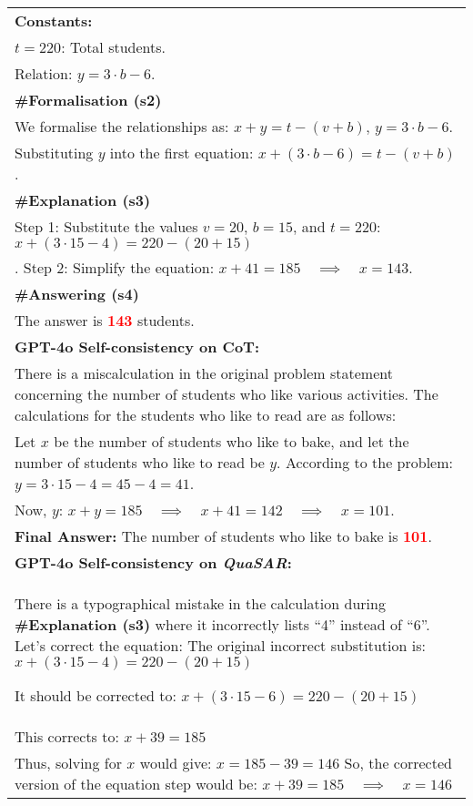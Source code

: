 \documentclass[11pt]{article}
\newcommand{\QuaSAR}{\emph{QuaSAR}\xspace}
\begin{document}
\begin{table*}[h!]
\begin{tabular}{p{16cm}}
\textbf{Constants:}\\
\hspace*{0.5cm} \( t = 220 \): Total students.\\
\hspace*{0.5cm} Relation: \( y = 3 \cdot b - 6. \)\\
\textbf{\#Formalisation (s2)}\\
We formalise the relationships as:
$x + y = t - (v + b)$, $y = 3 \cdot b - 6$.\\
Substituting \( y \) into the first equation:
$x + (3 \cdot b - 6) = t - (v + b)$.
\\
\textbf{\#Explanation (s3)}\\
Step 1: Substitute the values \( v = 20 \), \( b = 15 \), and \( t = 220 \):
$x + (3 \cdot 15 - 4) = 220 - (20 + 15)$\\.
Step 2: Simplify the equation:
$x + 41 = 185 \quad \implies \quad x = 143$.
\\
\textbf{\#Answering (s4)}\\
The answer is \textcolor{red}{\textbf{143}} students.
\\
\midrule
\textbf{GPT-4o Self-consistency on CoT:} \\
There is a miscalculation in the original problem statement concerning the number of students who like various activities. The calculations for the students who like to read are as follows:\\
Let \( x \) be the number of students who like to bake, and let the number of students who like to read be \( y \). According to the problem:
 $y = 3 \cdot 15 - 4 = 45 - 4 = 41$.\\
Now, \( y \):
$x + y = 185 \quad \implies \quad x + 41 = 142 \quad \implies \quad x = 101$.\\

\textbf{Final Answer:} The number of students who like to bake is \textcolor{red}{\textbf{101}}. \\
\midrule
\textbf{GPT-4o Self-consistency on \QuaSAR:} \\
There is a typographical mistake in the calculation during \textbf{\#Explanation (s3)} where it incorrectly lists ``4'' instead of ``6''. Let's correct the equation:
The original incorrect substitution is:
$ x + (3 \cdot 15 - 4) = 220 - (20 + 15)$

It should be corrected to: $x + (3 \cdot 15 - 6) = 220 - (20 + 15)$\\

This corrects to: $x + 39 = 185$\\
Thus, solving for \( x \) would give: $x = 185 - 39 = 146$
So, the corrected version of the equation step would be:
$x + 39 = 185 \quad \implies \quad x = 146$


\end{tabular}
\end{table*}
\end{document}
